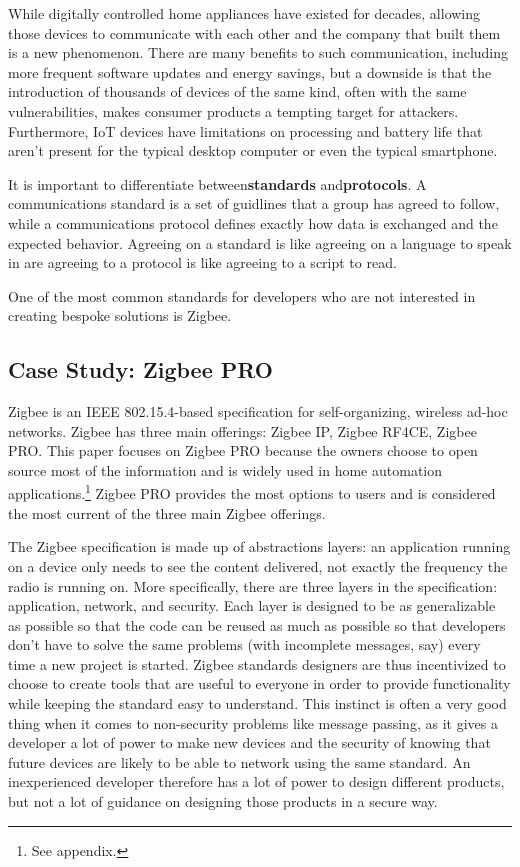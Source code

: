 While digitally controlled home appliances have existed for decades, allowing those devices to communicate with each other and the company that built them is a new phenomenon. 
There are many benefits to such communication, including more frequent software updates and energy savings, but a downside is that the introduction of thousands of devices of the same kind, often with the same vulnerabilities, makes consumer products a tempting target for attackers. 
Furthermore, IoT devices have limitations on processing and battery life that aren’t present for the typical desktop computer or even the typical smartphone. 

It is important to differentiate between{\bf standards} and{\bf protocols}. A communications standard is a set of guidlines that a group has agreed to follow, while a communications protocol defines exactly how data is exchanged and the expected behavior. Agreeing on a standard is like agreeing on a language to speak in are agreeing to a protocol is like agreeing to a script to read.

One of the most common standards for developers who are not interested in creating bespoke solutions is Zigbee. 

\subsection{Case Study: Zigbee PRO}
Zigbee is an IEEE 802.15.4-based specification for self-organizing, wireless ad-hoc networks. 
Zigbee has three main offerings: Zigbee IP, Zigbee RF4CE, Zigbee PRO. 
This paper focuses on Zigbee PRO because the owners choose to open source most of the information and is widely used in home automation applications.\footnote{See appendix.} 
Zigbee PRO provides the most options to users and is considered the most current of the three main Zigbee offerings.

The Zigbee specification is made up of abstractions layers: an application running on a device only needs to see the content delivered, not exactly the frequency the radio is running on.
More specifically, there are three layers in the specification: application, network, and security.
Each layer is designed to be as generalizable as possible so that the code can be reused as much as possible so that developers don't have to solve the same problems (with incomplete messages, say) every time a new project is started.
Zigbee standards designers are thus incentivized to choose to create tools that are useful to everyone in order to provide functionality while keeping the standard easy to understand. 
This instinct is often a very good thing when it comes to non-security problems like message passing, as it gives a developer a lot of power to make new devices and the security of knowing that future devices are likely to be able to network using the same standard.
An inexperienced developer therefore has a lot of power to design different products, but not a lot of guidance on designing those products in a secure way. 

